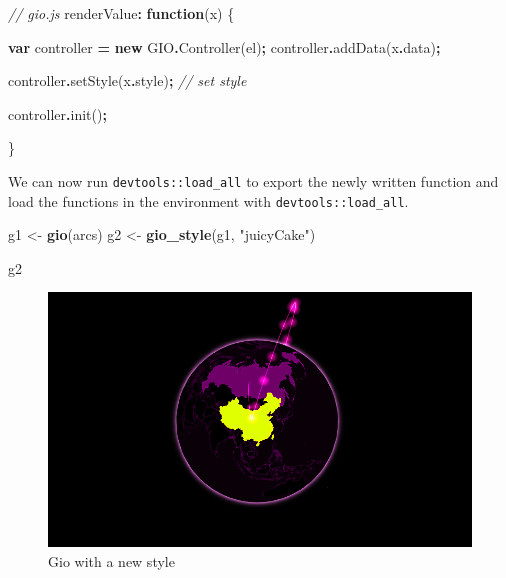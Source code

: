 \documentclass[
]{krantz}
\makeatletter
\newenvironment{Shaded}{\begin{snugshade}}{\end{snugshade}}
\newcommand{\AttributeTok}[1]{\textcolor[rgb]{0.61,0.61,0.61}{#1}}
\newcommand{\CommentTok}[1]{\textcolor[rgb]{0.37,0.37,0.37}{\textit{#1}}}
\newcommand{\FunctionTok}[1]{\textcolor[rgb]{0,0,0}{#1}}
\newcommand{\KeywordTok}[1]{\textcolor[rgb]{0.27,0.27,0.27}{\textbf{#1}}}
\newcommand{\NormalTok}[1]{#1}
\newcommand{\OperatorTok}[1]{\textcolor[rgb]{0.43,0.43,0.43}{\textbf{#1}}}
\newcommand{\StringTok}[1]{\textcolor[rgb]{0.5,0.5,0.5}{#1}}
\newenvironment{kframe}{%
\medskip{}
\setlength{\fboxsep}{.8em}
 \def\at@end@of@kframe{}%
 \ifinner\ifhmode%
  \def\at@end@of@kframe{\end{minipage}}%
  \begin{minipage}{\columnwidth}%
 \fi\fi%
 \def\FrameCommand##1{\hskip\@totalleftmargin \hskip-\fboxsep
 \colorbox{shadecolor}{##1}\hskip-\fboxsep
     \hskip-\linewidth \hskip-\@totalleftmargin \hskip\columnwidth}%
 \MakeFramed {\advance\hsize-\width
   \@totalleftmargin\z@ \linewidth\hsize
   \@setminipage}}%
 {\par\unskip\endMakeFramed%
 \at@end@of@kframe}
\renewenvironment{Shaded}{\begin{kframe}}{\end{kframe}}
\makeatother
\begin{document}
\begin{Shaded}
\begin{Highlighting}[]
\CommentTok{// gio.js}
\NormalTok{renderValue}\OperatorTok{:} \KeywordTok{function}\NormalTok{(x) \{}

  \KeywordTok{var}\NormalTok{ controller }\OperatorTok{=} \KeywordTok{new}\NormalTok{ GIO}\OperatorTok{.}\FunctionTok{Controller}\NormalTok{(el)}\OperatorTok{;}
\NormalTok{  controller}\OperatorTok{.}\FunctionTok{addData}\NormalTok{(x}\OperatorTok{.}\AttributeTok{data}\NormalTok{)}\OperatorTok{;} 

\NormalTok{  controller}\OperatorTok{.}\FunctionTok{setStyle}\NormalTok{(x}\OperatorTok{.}\AttributeTok{style}\NormalTok{)}\OperatorTok{;} \CommentTok{// set style}

\NormalTok{  controller}\OperatorTok{.}\FunctionTok{init}\NormalTok{()}\OperatorTok{;}

\NormalTok{\}}
\end{Highlighting}
\end{Shaded}

We can now run \texttt{devtools::load\_all} to export the newly written function and load the functions in the environment with \texttt{devtools::load\_all}.

\begin{Shaded}
\begin{Highlighting}[]
\NormalTok{g1 \textless{}{-}}\StringTok{ }\KeywordTok{gio}\NormalTok{(arcs)}
\NormalTok{g2 \textless{}{-}}\StringTok{ }\KeywordTok{gio\_style}\NormalTok{(g1, }\StringTok{"juicyCake"}\NormalTok{)}

\NormalTok{g2}
\end{Highlighting}
\end{Shaded}

\begin{figure}
\centering
\includegraphics{images/gio-style.png}
\caption{Gio with a new style}
\end{figure}
\end{document}
